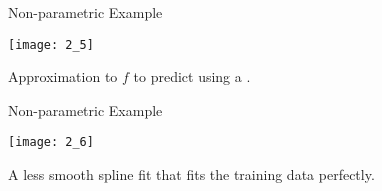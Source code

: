 \documentclass[mathserif, aspectratio=169]{beamer}
\begin{document}
\begin{frame}{Non-parametric Example}
	\vspace{-5mm}
	\begin{center}
		\texttt{[image: 2\_5]}

		Approximation to $f$ to predict  using a . 
	\end{center}
\end{frame}

\begin{frame}{Non-parametric Example}
	\vspace{-5mm}
	\begin{center}
		\texttt{[image: 2\_6]}

		A less smooth spline fit that fits the training data perfectly. 
	\end{center}
\end{frame}
\end{document}
